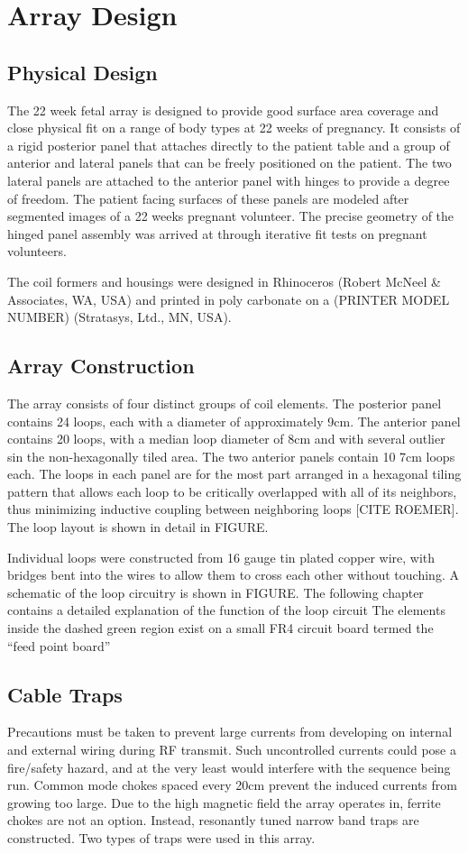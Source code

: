 \chapter{Array Design}
\section{Physical Design}
The 22 week fetal array is designed to provide good surface area coverage and close physical fit on a range of body
types at 22 weeks of pregnancy.  It consists of a rigid posterior panel that attaches directly to the patient table and
a group of anterior and lateral panels that can be freely positioned on the patient. The two lateral panels are attached
to the anterior panel with hinges to provide a degree of freedom. The patient facing surfaces of these panels are
modeled after segmented images of a 22 weeks pregnant volunteer. The precise geometry of the hinged panel assembly was
arrived at through iterative fit tests on pregnant volunteers.
  
The coil formers and housings were designed in Rhinoceros (Robert McNeel \& Associates, WA, USA) and printed in
poly carbonate on a (PRINTER MODEL NUMBER) (Stratasys, Ltd., MN, USA).

\section{Array Construction}
The array consists of four distinct groups of coil elements. The posterior panel contains 24 loops, each with a diameter
of approximately 9cm. The anterior panel contains 20 loops, with a median loop diameter of 8cm and with several
outlier sin the non-hexagonally tiled area. The two anterior panels contain 10 7cm loops each. The loops in each panel
are for the most part arranged in a hexagonal tiling pattern that allows each loop to be critically overlapped with all
of its neighbors,  thus minimizing inductive coupling between neighboring loops [CITE ROEMER]. The loop layout is shown
in detail in FIGURE.

Individual loops were constructed from 16 gauge tin plated copper wire, with bridges bent into the wires to allow them
to cross each other without touching. A schematic of the loop circuitry is shown in FIGURE. The following chapter
contains a detailed explanation of the function of the loop circuit The elements inside the dashed green region exist on
a small FR4 circuit board termed the “feed point board” 

\section{Cable Traps}
Precautions must be taken to prevent large currents from developing on internal and external wiring during RF
transmit. Such uncontrolled currents could pose a fire/safety hazard, and at the very least would interfere with the
sequence being run.  Common mode chokes spaced every 20cm prevent the induced currents from growing too large. Due to
the high magnetic field the array operates in, ferrite chokes are not an option. Instead, resonantly tuned narrow band
traps are constructed. Two types of traps were used in this array.

